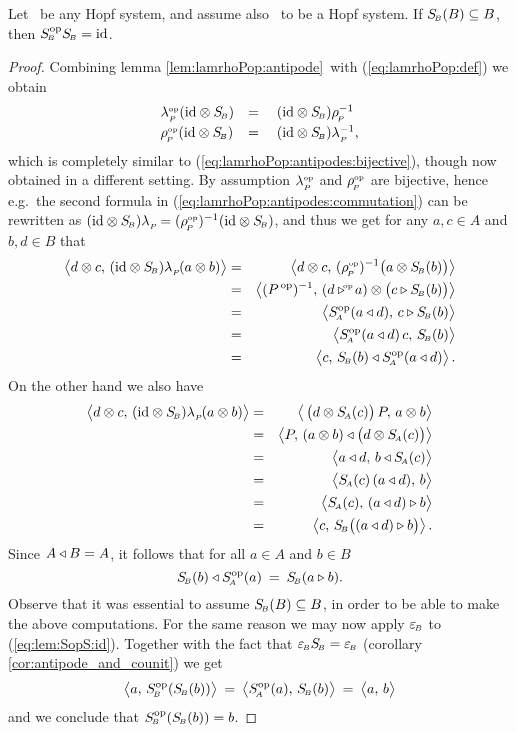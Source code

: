 \begin{lemma_sec} \label{lem:ABop_invertible_implies_SSop_equal_id}
Let\/ \pairAB\ be any Hopf system, and assume also\/ \pairABop\ to be a Hopf system.
If\/ $S_{\scriptscriptstyle \! B}(B) \subseteq B$, then\/ $S_{\scriptscriptstyle \! B}^{\rm op} S_{\scriptscriptstyle \! B} = \mbox{\rm id}$.
\end{lemma_sec}
\begin{proof}
Combining lemma \ref{lem:lamrhoPop:antipode}\ with (\ref{eq:lamrhoPop:def})
we obtain
\begin{equation} \label{eq:lamrhoPop:antipodes:commutation}
\begin{array}{lll}
   \lpop (\id \tens \SB) &=& (\id \tens \SB)\rp^{-1}
   \\
   \rpop (\id \tens \SB) &=\vertL& (\id \tens \SB)\lp^{-1},
\end{array}
\end{equation}
which is completely similar to (\ref{eq:lamrhoPop:antipodes:bijective}),
though now obtained in a different setting.
By assumption $\lambda^{\scriptscriptstyle \rm op}_{_P\!}$ and $\rho^{\scriptscriptstyle \rm op}_{_{\!P}}$ are bijective, hence e.g.\ the second formula in
(\ref{eq:lamrhoPop:antipodes:commutation}) can be rewritten as
$(\mbox{\rm id} \otimes S_{\scriptscriptstyle \! B}) \lambda_{_P\!} = (\rho^{\scriptscriptstyle \rm op}_{_{\!P}})^{-1} (\mbox{\rm id} \otimes S_{\scriptscriptstyle \! B})$, and
thus we get for any $a,c \in A$ and $b,d \in B$ that
\begin{eqnarray*}
       \pairM{d \tens c}{(\id \tens \SB)\lp(a \tens b)}
  &=&
       \pairM{d \tens c}{(\rpop)^{-1}\!\left(\vertM  a \tens \SB(b)\right)}
\\&=&
       \pairM{(\Pop)^{-1}}{(d \lactop a) \tens \left(\vertM c \lact \SB(b)\right)}
\\&=&
       \pairM{\SA\op(a \ract d)}{c \lact \SB(b)}
\\&=&
       \pairM{\SA\op(a \ract d) \,c}{\SB(b)}
\\&=&
       \pairM{c}{\SB(b) \ract \SA\op(a \ract d)}.
\end{eqnarray*}
On the other hand we also have
\begin{eqnarray*}
       \pairM{d \tens c}{(\id \tens \SB)\lp(a \tens b)}
  &=&
       \pairM{\left(\vertM  d \tens \SA(c)\right)P}{a \tens b}
\\&=&
       \pairM{P}{(a \tens b) \ract \left(\vertM d \tens \SA(c)\right)}
\\&=&
       \pairM{a \ract d}{b \ract \SA(c)}
\\&=&
       \pairM{\SA(c)\,(a \ract d)}{b}
\\&=&
       \pairM{\SA(c)}{(a \ract d) \lact b}
\\&=&
       \pairM{c}{\SB \! \left(\vertM (a \ract d) \lact b \right)}.
\end{eqnarray*}
Since $A \triangleleft B = A$, it follows that for all $a \in A$ and $b \in B$
\begin{equation}\label{eq:lem:SopS:id}
  S_{\scriptscriptstyle \! B}(b) \triangleleft S_{\scriptscriptstyle \! A}^{\rm op}(a)  \:=\: S_{\scriptscriptstyle \! B}(a \triangleright b).
\end{equation}
Observe that it was essential to assume $S_{\scriptscriptstyle \! B}(B) \subseteq B$, in order to be
able to make the above computations.
For the same reason we may now apply $\varepsilon_{\scriptscriptstyle \! B}$ to (\ref{eq:lem:SopS:id}).
Together with the fact that $\varepsilon_{\scriptscriptstyle \! B} S_{\scriptscriptstyle \! B} = \varepsilon_{\scriptscriptstyle \! B}$
(corollary \ref{cor:antipode_and_counit}) we get
$$ \pairM{a}{\SB\op (\SB(b))}  \:=\: \pairM{\SA\op(a)}{\SB(b)}  \:=\: \pairM{a}{b} $$
and we conclude that $S_{\scriptscriptstyle \! B}^{\rm op}(S_{\scriptscriptstyle \! B}(b)) = b$.
\end{proof}
